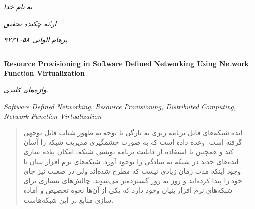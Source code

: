 ﻿\documentclass[11pt]{article}
\begin{document}
\begin{titlepage}
	\centering
	\emph{به نام خدا}\par
	\vspace{.5cm}
	\emph{ارائه چکیده تحقیق}\par
	\vspace{.5cm}
	\emph{پرهام الوانی ۹۲۳۱۰۵۸}\par
	\vspace{.25cm}
	\rule{\textwidth}{1pt}
	\vspace{.25cm}
	\begin{latin}
		{\huge\bfseries Resource Provisioning in Software Defined Networking Using Network Function Virtualization} \par
	\end{latin}
	\vspace{.5cm}
	\emph{واژه‌های کلیدی:}
	\vspace{.1cm}
	\begin{latin}
		\emph{Software Defined Networking, Resource Provisioning, Distributed Computing, Network Function Virtualization}
	\end{latin}
\end{titlepage}
\begin{abstract}
	ایده شبکه‌های قابل برنامه ریزی به تازگی با توجه به ظهور  شتاب قابل توجهی گرفته است.
	 وعده داده است که به صورت چشمگیری مدیریت شبکه را آسان کند و همچنین با استفاده از قابلیت برنامه نویسی شبکه، امکان پیاده سازی ایده‌های جدید در شبکه به سادگی را بوجود آورد.
شبکه‌های نرم افزار بنیان با وجود اینکه مدت زمان زیادی نیست که مطرح شده‌اند ولی در صعنت نیز جای خود را پیدا کرده‌اند و روز به روز گسترده‌تر می‌شوند. چالش‌های بسیاری برای شبکه‌های نرم افزار بنیان وجود دارد که یکی از آن‌ها نحوه تخصیص و آماده سازی منابع در این شبکه‌هاست.
\end{abstract}
\end{document}
